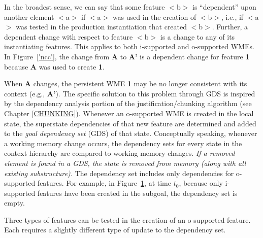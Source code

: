 In the broadest sense, we can say that some feature $<$b$>$ is ``dependent'' upon another element $<$a$>$ if $<$a$>$ was used in the creation of $<$b$>$, i.e., if $<$a$>$ was tested in the production instantiation that created $<$b$>$. Further, a dependent change with respect to feature $<$b$>$ is a change to any of its instantiating features. This applies to both i-supported and o-supported WMEs. In Figure~\ref{'ncc'}, the change from {\bf A} to {\bf A'} is a dependent change for feature {\bf 1} because {\bf A} was used to create {\bf 1}.


When {\bf A} changes, the persistent WME {\bf 1} may be no longer consistent with its context (e.g., {\bf A'}).  The specific solution to this problem through GDS is inspired by the dependency analysis portion of the justification/chunking algorithm (see Chapter \ref{CHUNKING}). Whenever an o-supported WME is created in the local state, the superstate dependencies of that new feature are determined and added to the {\em goal dependency set} (GDS) of that state. Conceptually speaking, whenever a working memory change occurs, the dependency sets for every state in the context hierarchy are compared to working memory changes. \textit{If a removed element  is found in a GDS, the state is removed from memory (along with all existing substructure).} The dependency set includes only dependencies for o-supported features.  For example, in Figure~\ref{'gds'}, at time $t_0$, because only i-supported features have been created in the subgoal, the dependency set is empty.

\begin{figure}
	\label{'gds'}
\end{figure}


Three types of features can be tested in the creation of an o-supported feature.  Each requires a slightly different type of update to the dependency set.

